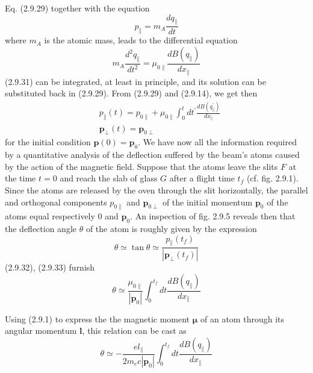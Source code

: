 \documentclass{article}
\begin{document}
Eq. (2.9.29) together with the equation
$$
\begin{equation*}
p_{\|}=m_{A} \frac{d q_{\|}}{d t} \tag{2.9.30}
\end{equation*}
$$
where $m_{A}$ is the atomic mass, leads to the differential equation
$$
\begin{equation*}
m_{A} \frac{d^{2} q_{\|}}{d t^{2}}=\mu_{0 \|} \frac{d B\left(q_{\|}\right)}{d x_{\|}} \tag{2.9.31}
\end{equation*}
$$
(2.9.31) can be integrated, at least in principle, and its solution can be substituted back in (2.9.29). From (2.9.29) and (2.9.14), we get then
$$
\begin{align*}
& p_{\|}(t)=p_{0 \|}+\mu_{0 \|} \int_{0}^{t} d t^{\prime} \frac{d B\left(q_{\|}^{\prime}\right)}{d x_{\|}}  \tag{2.9.32}\\
& \boldsymbol{p}_{\perp}(t)=\boldsymbol{p}_{0 \perp} \tag{2.9.33}
\end{align*}
$$
for the initial condition $\boldsymbol{p}(0)=\boldsymbol{p}_{0}$.
We have now all the information required by a quantitative analysis of the deflection suffered by the beam's atoms caused by the action of the magnetic field. Suppose that the atoms leave the slits $F$ at the time $t=0$ and reach the slab of glass $G$ after a flight time $t_{f}$ (cf. fig. 2.9.1). Since the atoms are released by the oven through the slit horizontally, the parallel and orthogonal components $p_{0 \|}$ and $\boldsymbol{p}_{0 \perp}$ of the initial momentum $\boldsymbol{p}_{0}$ of the atoms equal respectively 0 and $\boldsymbol{p}_{0}$. An inspection of fig. 2.9.5 reveals then that the deflection angle $\theta$ of the atom is roughly given by the expression
$$
\begin{equation*}
\theta \simeq \tan \theta \simeq \frac{p_{\|}\left(t_{f}\right)}{\left|\boldsymbol{p}_{\perp}\left(t_{f}\right)\right|} \tag{2.9.34}
\end{equation*}
$$
(2.9.32), (2.9.33) furnish
$$
\begin{equation*}
\theta \simeq \frac{\mu_{0 \|}}{\left|\boldsymbol{p}_{0}\right|} \int_{0}^{t_{f}} d t \frac{d B\left(q_{\|}\right)}{d x_{\|}} \tag{2.9.35}
\end{equation*}
$$

Using (2.9.1) to express the the magnetic moment $\boldsymbol{\mu}$ of an atom through its angular momentum $\boldsymbol{l}$, this relation can be cast as
$$
\begin{equation*}
\theta \simeq-\frac{e l_{\|}}{2 m_{e} c\left|\boldsymbol{p}_{0}\right|} \int_{0}^{t_{f}} d t \frac{d B\left(q_{\|}\right)}{d x_{\|}} \tag{2.9.36}
\end{equation*}
$$
\end{document}
